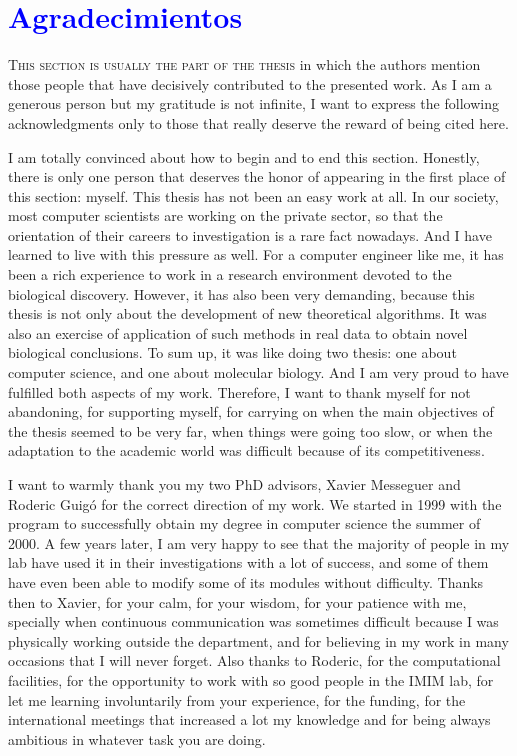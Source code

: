 \chapter*{\textcolor{blue}{\textbf{A}gradecimientos}}

\lettrine[lines=4,loversize=-0.1,lraise=0.1,lhang=.2]{T}{his section is usually the part of the thesis}
in which the authors mention those people that have decisively contributed to the
presented work. As I am a generous person but my gratitude is not infinite,
I want to express the following acknowledgments only to those that really deserve
the reward of being cited here.

I am totally convinced about how to begin and to end this
section. Honestly, there is only one person that deserves the honor
of appearing in the first place of this section: myself. This thesis
has not been an easy work at all. In our society, most computer scientists
are working on the private sector, so that the orientation of their careers
to investigation is a rare fact nowadays. And I have learned to live with
this pressure as well. For a computer engineer like me, it has been a rich
experience to work in a research environment
devoted to the biological discovery. However, it has also been very demanding,
because this thesis is not only about the development of new theoretical
algorithms. It was also an exercise of application of such methods in real data
to obtain novel biological conclusions. To sum up, it was like doing two thesis:
one about computer science, and one about molecular biology. And I am very proud
to have fulfilled both aspects of my work. Therefore, I want to thank myself
for not abandoning, for supporting myself, for carrying on when the main
objectives of the thesis seemed to be very far, when things were going too slow, or
when the adaptation to the academic world was difficult because of its
competitiveness.

I want to warmly thank you my two PhD advisors, Xavier Messeguer and Roderic Guig\'o
for the correct direction of my work. We started in 1999 with the program
 to successfully obtain my degree in computer science the summer
of 2000. A few years later, I am very happy to see that the majority of people
in my lab have used it in their investigations with a lot of success, and some of
them have even been able to modify some of its modules without difficulty. Thanks
then to Xavier, for your calm, for your wisdom, for your patience with me, specially
when continuous communication was sometimes difficult because I was physically
working outside the department, and for believing in my work in many occasions that
I will never forget. Also thanks to Roderic, for the computational facilities,
for the opportunity to work with so good people in the IMIM lab, for let me
learning involuntarily from your experience, for the funding, for the international
meetings that increased a lot my knowledge and for being always ambitious in whatever
task you are doing.

